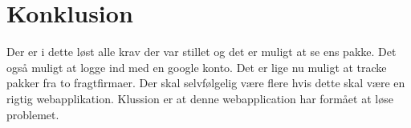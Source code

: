 \chapter{Konklusion}
Der er i dette løst alle krav der var stillet og det er muligt at se ens pakke.
Det også muligt at logge ind med en google konto. Det er lige nu muligt at tracke 
pakker fra to fragtfirmaer. Der skal selvfølgelig være flere hvis dette skal være 
en rigtig webapplikation. Klussion er at denne webapplication har formået at løse problemet.
 